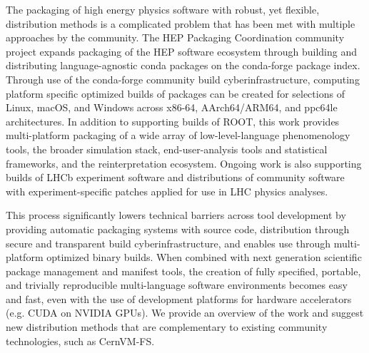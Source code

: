 The packaging of high energy physics software with robust, yet flexible, distribution methods is a complicated problem that has been met with multiple approaches by the community.
The HEP Packaging Coordination community project expands packaging of the HEP software ecosystem through building and distributing language-agnostic conda packages on the conda-forge package index.
Through use of the conda-forge community build cyberinfrastructure, computing platform specific optimized builds of packages can be created for selections of Linux, macOS, and Windows across x86-64, AArch64/ARM64, and ppc64le architectures.
In addition to supporting builds of ROOT, this work provides multi-platform packaging of a wide array of low-level-language phenomenology tools, the broader simulation stack, end-user-analysis tools and statistical frameworks, and the reinterpretation ecosystem.
Ongoing work is also supporting builds of LHCb experiment software and distributions of community software with experiment-specific patches applied for use in LHC physics analyses.

This process significantly lowers technical barriers across tool development by providing automatic packaging systems with source code, distribution through secure and transparent build cyberinfrastructure, and enables use through multi-platform optimized binary builds.
When combined with next generation scientific package management and manifest tools, the creation of fully specified, portable, and trivially reproducible multi-language software environments becomes easy and fast, even with the use of development platforms for hardware accelerators (e.g. CUDA on NVIDIA GPUs).
We provide an overview of the work  and suggest new distribution methods that are complementary to existing community technologies, such as CernVM-FS.
